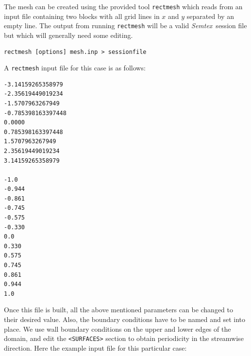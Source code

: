 \documentclass[11pt,a4paper]{report}
\newcommand{\Semtex}{\emph{Semtex}}
\begin{document}
The mesh can be created using the provided tool \texttt{rectmesh}
which reads from an input file containing two blocks with all grid
lines in $x$ and $y$ separated by an empty line. The output from
running \verb|rectmesh| will be a valid \Semtex\ session file but which
will generally need some editing. 

{\small
\begin{verbatim}
rectmesh [options] mesh.inp > sessionfile
\end{verbatim}
}

A \verb|rectmesh| input file for this case is as follows: {\small
\begin{verbatim}
-3.14159265358979
-2.35619449019234
-1.5707963267949
-0.785398163397448
0.0000
0.785398163397448
1.5707963267949
2.35619449019234
3.14159265358979

-1.0
-0.944
-0.861
-0.745
-0.575
-0.330
0.0
0.330
0.575
0.745
0.861
0.944
1.0
\end{verbatim}
}

Once this file is built, all the above mentioned parameters can be
changed to their desired value. Also, the boundary conditions have to
be named and set into place.  We use wall boundary conditions on the
upper and lower edges of the domain, and edit the \verb|<SURFACES>|
section to obtain periodicity in the streamwise direction. Here the
example input file for this particular case:
\end{document}
